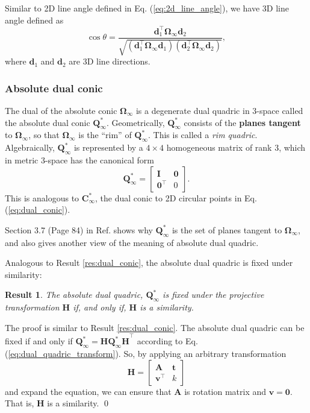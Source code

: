 \documentclass[12pt]{article}
\newtheorem{result}{Result}[section]
\numberwithin{equation}{section}
\renewenvironment{proof}{{\bfseries Proof.}}{\qed \\}
\begin{document}
Similar to 2D line angle defined in Eq. (\ref{eq:2d_line_angle}), we have 3D line angle defined as
\begin{equation}
\cos \theta = \frac{\mathbf{d}_1^\top\bm{\Omega}_{\infty} \mathbf{d}_2}{\sqrt{(\mathbf{d}_1^\top\bm{\Omega}_{\infty} \mathbf{d}_1)(\mathbf{d}_2^\top\bm{\Omega}_{\infty} \mathbf{d}_2)}},
\end{equation}
where $\mathbf{d}_1$ and $\mathbf{d}_2$ are 3D line directions.

\subsubsection{Absolute dual conic}

The dual of the absolute conic $\bm{\Omega}_{\infty}$ is a degenerate dual quadric in 3-space called the absolute dual conic $\mathbf{Q}_{\infty}^*$. Geometrically, $\mathbf{Q}_{\infty}^*$ consists of the \textbf{planes tangent} to $\bm{\Omega}_{\infty}$, so that $\bm{\Omega}_{\infty}$ is the ``rim'' of $\mathbf{Q}_{\infty}^*$. This is called a \textit{rim quadric}. Algebraically, $\mathbf{Q}_{\infty}^*$ is represented by a $4 \times 4$ homogeneous matrix of rank 3, which in metric 3-space has the canonical form 
\begin{equation}
\mathbf{Q}_{\infty}^* = 
\begin{bmatrix}
\mathbf{I} & \mathbf{0} \\
\mathbf{0}^\top & 0
\end{bmatrix}.
\label{eq:absolute_dual_quadric}
\end{equation}
This is analogous to $\mathbf{C}_{\infty}^*$, the dual conic to 2D circular points in Eq. (\ref{eq:dual_conic}).

Section 3.7 (Page 84) in Ref. \cite{hartley2003multiple} shows why 
$\mathbf{Q}_{\infty}^*$ is the set of planes tangent to $\bm{\Omega}_{\infty}$, and also gives another view of the meaning of absolute dual quadric.

Analogous to Result \ref{res:dual_conic}, the absolute dual quadric is fixed under similarity: \\

\begin{result}
The absolute dual quadric, $\mathbf{Q}_{\infty}^*$ is fixed under the projective transformation $\mathbf{H}$ if, and only if, $\mathbf{H}$ is a similarity.
\end{result}
\begin{proof}
The proof is similar to Result \ref{res:dual_conic}. The absolute dual quadric can be fixed if and only if ${\mathbf{Q}_{\infty}^*} = \mathbf{H}\mathbf{Q_{\infty}^* H}^{\top}$ according to Eq. (\ref{eq:dual_quadric_transform}). So, by applying an arbitrary transformation 
\begin{equation*}
\mathbf{H} = 
\begin{bmatrix}
\mathbf{A} & \mathbf{t} \\
\mathbf{v}^\top & k
\end{bmatrix}
\end{equation*} 
and expand the equation, we can ensure that $\mathbf{A}$ is rotation matrix and $\mathbf{v} = \mathbf{0}$. That is, $\mathbf{H}$ is a similarity.
\end{proof}
\end{document}
